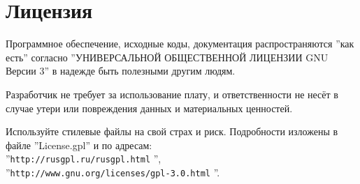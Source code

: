 \section{Лицензия}
Программное обеспечение, исходные коды, документация распространяются ''как есть'' согласно ''УНИВЕРСАЛЬНОЙ ОБЩЕСТВЕННОЙ ЛИЦЕНЗИИ GNU Версии 3'' в надежде быть полезными другим людям. 

Разработчик не требует за использование плату, и ответственности не несёт в случае утери или повреждения данных и материальных ценностей. 

Используйте стилевые файлы на свой страх и риск. Подробности изложены в файле ''License.gpl'' и по адресам:\\ ''\verb|http://rusgpl.ru/rusgpl.html| '',\\ ''\verb|http://www.gnu.org/licenses/gpl-3.0.html| ''.

